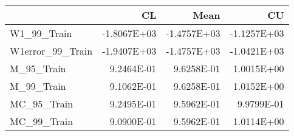 \begin{tabular}{lrrr}
\toprule
{} &          CL &        Mean &          CU \\
\midrule
W1\_99\_Train      & -1.8067E+03 & -1.4757E+03 & -1.1257E+03 \\
W1error\_99\_Train & -1.9407E+03 & -1.4757E+03 & -1.0421E+03 \\
M\_95\_Train       &  9.2464E-01 &  9.6258E-01 &  1.0015E+00 \\
M\_99\_Train       &  9.1062E-01 &  9.6258E-01 &  1.0152E+00 \\
MC\_95\_Train      &  9.2495E-01 &  9.5962E-01 &  9.9799E-01 \\
MC\_99\_Train      &  9.0900E-01 &  9.5962E-01 &  1.0114E+00 \\
\bottomrule
\end{tabular}
